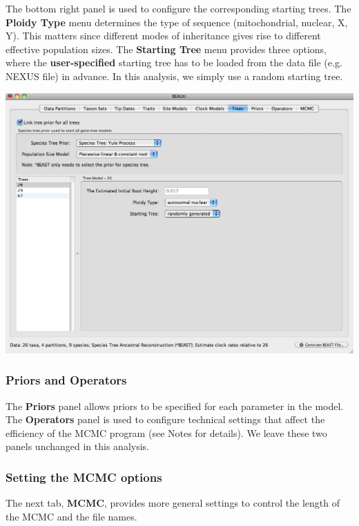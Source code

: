 \documentclass[12pt]{article}
\begin{document}
The bottom right panel is used to configure the corresponding starting trees. The \textbf{Ploidy Type} menu determines the type of sequence (mitochondrial, nuclear, X, Y). This matters since different modes of inheritance gives rise to different effective population sizes. The \textbf{Starting Tree} menu provides three options, where the \textbf{user-specified} starting tree has to be loaded from the data file (e.g. NEXUS file) in advance. In this analysis, we simply use a random starting tree. 

\medskip{}

\includegraphics[scale=0.4]{figures/BEAUti_Tree}

\medskip{}

\subsubsection*{Priors and Operators}

The {\bf Priors} panel allows priors to be specified for each parameter in the model. The {\bf Operators} panel is used to configure technical settings that affect the efficiency of the MCMC program (see Notes for details). We leave these two panels unchanged in this analysis.

\subsubsection*{Setting the MCMC options }

The next tab, {\bf MCMC}, provides more general
settings to control the length of the MCMC and the file names. 
\end{document}
